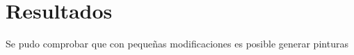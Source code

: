 \documentclass[../main.tex]{subfiles}
\begin{document}
\section{Resultados}
Se pudo comprobar que con pequeñas modificaciones es posible generar pinturas
\end{document}

